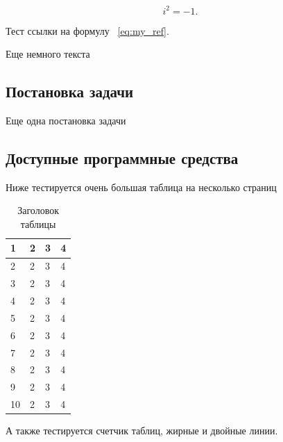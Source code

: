 \documentclass[a4paper,article,14pt]{extarticle}
\begin{document}
\begin{equation}
    i^2 = -1.
    \label{eq:my_ref}
\end{equation}

Тест ссылки на формулу ~\ref{eq:my_ref}.

Еще немного текста

\subsection{Постановка задачи}

Еще одна постановка задачи

\subsection{Доступные программные средства}

Ниже тестируется очень большая таблица на несколько страниц

\begin{center}
    \begin{longtable}{|p{2cm}|p{3cm}|p{7cm}|p{3cm}|}
    \caption{Заголовок таблицы}\\
    \hline
    1 & 2 & 3 & 4\\ 
    \hline 
    2 & 2 & 3 & 4\\
    \hline
    3 & 2 & 3 & 4\\
    \hline
    4 & 2 & 3 & 4\\
    \hline
    5 & 2 & 3 & 4\\
    \hline
    6 & 2 & 3 & 4\\
    \hline
    7 & 2 & 3 & 4\\
    \hline
    8 & 2 & 3 & 4\\
    \hline
    9 & 2 & 3 & 4\\
    \hline
    10 & 2 & 3 & 4\\
    \hline
    
    
    \end{longtable}
\end{center}


А также тестируется счетчик таблиц, жирные и двойные линии.
\end{document}
